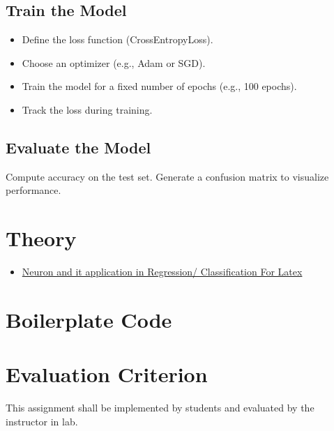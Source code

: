 \documentclass[11pt]{article}
\newcommand{\bvricon}[1]{}
\begin{document}
\subsection{Train the Model}
\label{sec:orgd824128}
\begin{itemize}
\item Define the loss function (CrossEntropyLoss).
\item Choose an optimizer (e.g., Adam or SGD).
\item Train the model for a fixed number of epochs (e.g.,
100 epochs).
\item Track the loss during training.
\end{itemize}
\subsection{Evaluate the Model}
\label{sec:org4121580}
Compute accuracy on the test set.  Generate a confusion
matrix to visualize performance.
\section{Theory}
\label{sec:org8b06197}
\begin{itemize}
\item \href{https://docs.google.com/presentation/d/1Y0N7jhqgCFR6K1e48iIxqRxBkzKXEe27QUDyQ9\_DGLc/edit?usp=sharing}{Neuron and it application in Regression/
Classification For Latex}
\end{itemize}
\section{Boilerplate Code}
\label{sec:orgfcc4ab3}
\section{Evaluation Criterion}
\label{sec:orgf57302e}

This assignment shall be implemented by students and
evaluated by the instructor in lab.
\end{document}

